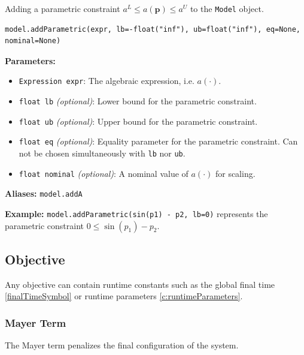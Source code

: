\documentclass[12pt]{article}
\renewcommand{\v}{\bm}
\begin{document}
\begin{mdframed}[backgroundcolor=gray!10, roundcorner=10pt,
		linewidth=1pt]

	Adding a parametric constraint ${a}^{L} \leq {a}(\v{p}) \leq
		{a}^{U}$ to the \texttt{Model} object.

	\begin{lstlisting}
model.addParametric(expr, lb=-float("inf"), ub=float("inf"), eq=None, nominal=None)
		\end{lstlisting}
	\label{addParametric}
	\textbf{Parameters:}
	\begin{itemize}
		\item \texttt{Expression expr}: The algebraic
		      expression, i.e. $a(\cdot)$.
		\item \texttt{float lb} \emph{(optional)}: Lower bound
		      for the parametric constraint.
		\item \texttt{float ub} \emph{(optional)}: Upper bound
		      for the parametric constraint.
		\item \texttt{float eq} \emph{(optional)}: Equality
		      parameter for the parametric constraint. Can not be
		      chosen simultaneously with
		      \texttt{lb} nor \texttt{ub}.
		\item \texttt{float nominal} \emph{(optional)}: A
		      nominal value of $a(\cdot)$ for scaling.
	\end{itemize}

	\textbf{Aliases:}  \texttt{model.addA}

	\textbf{Example:} \texttt{model.addParametric(sin(p1) -
		p2, lb=0)} represents the parametric constraint
	$0 \leq \sin(p_1) - p_2$.
\end{mdframed}

\subsection{Objective}

Any objective can contain runtime constants such as the global
final time \eqref{finalTimeSymbol} or runtime parameters
\eqref{c:runtimeParameters}.

\subsubsection{Mayer Term}

The Mayer term penalizes the final configuration of the system.
\end{document}
